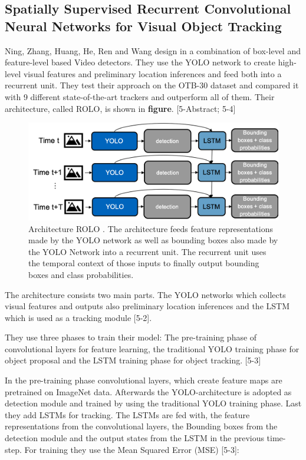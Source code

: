 \documentclass[conference]{IEEEtran}
\begin{document}
\subsection{Spatially Supervised Recurrent Convolutional Neural Networks for Visual Object Tracking \cite{b5}}
Ning, Zhang, Huang, He, Ren and Wang design in \cite{b5} a combination of box-level and feature-level based Video detectors. They use the YOLO \cite{b27} network to create high-level visual features and preliminary location inferences and feed both into a recurrent unit. They test their approach on the OTB-30 dataset \cite{b28} and compared it with 9 different state-of-the-art trackers and outperform all of them. Their architecture, called ROLO, is shown in \textbf{figure}. [5-Abstract; 5-4] 

\begin{figure} [h]
\includegraphics[width=\columnwidth]{ROLO}
\caption{Architecture ROLO \cite{b5}. The architecture feeds feature representations made by the YOLO network as well as bounding boxes also made by the YOLO Network into a recurrent unit. The recurrent unit uses the temporal context of those inputs to finally output bounding boxes and class probabilities.}
\end{figure}

The architecture consists two main parts. The YOLO \cite{27} networks which collects visual features and outputs also preliminary location inferences and the LSTM which is used as a tracking module [5-2]. \newline 

They use three phases to train their model: The pre-training phase of  convolutional layers for feature learning, the traditional YOLO training phase for object proposal and the LSTM training phase for object tracking. [5-3]  \newline

In the pre-training phase convolutional layers, which create feature maps are pretrained on ImageNet data. Afterwards the YOLO-architecture is adopted as detection module and trained by using the traditional YOLO training phase. Last they add LSTMs for tracking. The LSTMs are fed with, the feature representations from the convolutional layers, the Bounding boxes from the detection module and the output states from the LSTM in the previous time-step. For training they use the Mean Squared Error (MSE) [5-3]: \newline
\end{document}
